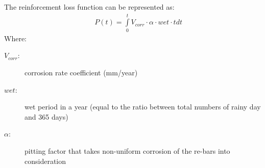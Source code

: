 The reinforcement loss function can be represented as:
%
\begin{eqnarray}
      && P(t) = \int\limits_0^t {{V_{corr}} \cdot \alpha  \cdot wet \cdot tdt}  \label{eq34}
\end{eqnarray}
Where:
\begin{adjustwidth}{1cm}{}
\begin{description}
\item[${V_{corr}}$:] corrosion rate coefficient (mm/year)
\item[$wet$:] wet period in a year (equal to the ratio between total numbers of rainy day and 365 days)
\item[$\alpha $:] pitting factor that takes non-uniform corrosion of the re-bars into consideration
\end{description}
\end{adjustwidth}

